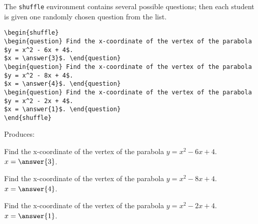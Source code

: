 \documentclass{ximera}
\begin{document}
\begin{example} The \verb!shuffle! environment contains several possible questions; then each student is given one randomly chosen question from the list.

\begin{verbatim}
\begin{shuffle}
\begin{question} Find the x-coordinate of the vertex of the parabola $y = x^2 - 6x + 4$. 
$x = \answer{3}$. \end{question}
\begin{question} Find the x-coordinate of the vertex of the parabola $y = x^2 - 8x + 4$. 
$x = \answer{4}$. \end{question}
\begin{question} Find the x-coordinate of the vertex of the parabola $y = x^2 - 2x + 4$. 
$x = \answer{1}$. \end{question}
\end{shuffle}
\end{verbatim}

Produces:
\begin{shuffle}
\begin{question} Find the x-coordinate of the vertex of the parabola $y = x^2 - 6x + 4$. 
$x = \answer{3}$. \end{question}
\begin{question} Find the x-coordinate of the vertex of the parabola $y = x^2 - 8x + 4$. 
$x = \answer{4}$. \end{question}
\begin{question} Find the x-coordinate of the vertex of the parabola $y = x^2 - 2x + 4$. 
$x = \answer{1}$. \end{question}
\end{shuffle}

\end{example}
\end{document}
